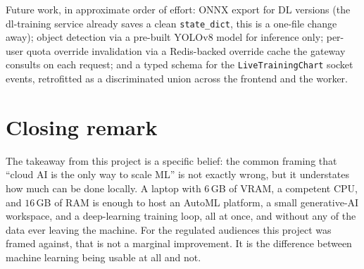 \documentclass[12pt, a4paper, oneside]{report}
\begin{document}
Future work, in approximate order of effort: ONNX export for DL
versions (the dl-training service already saves a clean
\texttt{state\_dict}, this is a one-file change away); object
detection via a pre-built YOLOv8 model for inference only; per-user
quota override invalidation via a Redis-backed override cache the
gateway consults on each request; and a typed schema for the
\texttt{LiveTrainingChart} socket events, retrofitted as a
discriminated union across the frontend and the worker.

\section*{Closing remark}

The takeaway from this project is a specific belief: the common
framing that ``cloud AI is the only way to scale ML'' is not exactly
wrong, but it understates how much can be done locally. A laptop
with $6$\,GB of VRAM, a competent CPU, and $16$\,GB of RAM is enough
to host an AutoML platform, a small generative-AI workspace, and a
deep-learning training loop, all at once, and without any of the
data ever leaving the machine. For the regulated audiences this
project was framed against, that is not a marginal improvement. It
is the difference between machine learning being usable at all and
not.
\end{document}
